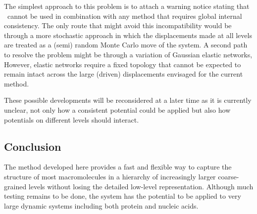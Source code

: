 The simplest approach to this problem is to attach a warning notice stating that \NAME\ cannot
be used in combination with any method that requires global internal consistency.   The only
route that might avoid this incompatibility would be through a more stochastic approach
in which the displacements made at all levels are treated as a (semi) random Monte Carlo
move of the system.
A second path to resolve the problem might be through a variation of Gaussian elastic
networks, However, elastic
networks require a fixed topology that cannot be expected to remain intact across the
large (driven) displacements envisaged for the current method.

These possible developments will be reconsidered at a later time as it is currently
unclear, not only how a consistent potential could be applied but also how potentials
on different levels should interact.

\subsection{Conclusion}

The method developed here provides a fast and flexible way to capture the
structure of most macromolecules in a hierarchy of increasingly larger coarse-grained
levels without losing the detailed low-level representation.   Although much testing
remains to be done, the system has the potential to be applied to very large dynamic
systems including both protein and nucleic acids.
